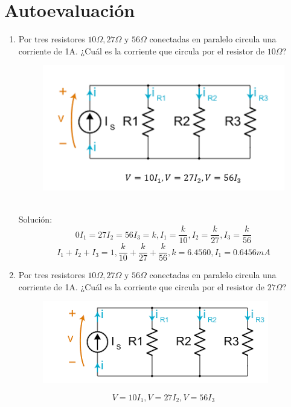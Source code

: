 \section{Autoevaluación}
\begin{enumerate}
	\item Por tres resistores $10\Omega, 27\Omega$ y $56\Omega$ conectadas en paralelo circula una corriente de 1A. ¿Cuál es la corriente que circula por el resistor de $10\Omega$?
	\begin{figure}[h]
		\centering
		\includegraphics[scale=1]{imagenes/1}
	\end{figure}
	\\ Solución: 
	\begin{equation*}
		0I_{1}=27I_{2}=56I_{3}=k, I_{1}=\frac{k}{10}, I_{2}=\frac{k}{27}, I_{3}=\frac{k}{56}
	\end{equation*}
	\begin{equation*}
		I_{1}+ I_{2}+I_{3}=1,  \frac{k}{10}+\frac{k}{27}+\frac{k}{56}, k=6.4560, I_{1}= 0.6456mA
	\end{equation*}
	\item Por tres resistores $10\Omega, 27\Omega$ y $56\Omega$ conectadas en paralelo circula una corriente de 1A. ¿Cuál es la corriente que circula por el resistor de $27\Omega$?
	\begin{figure}[h]
		\centering
		\includegraphics[scale=1]{imagenes/2}
	\end{figure}
	\begin{equation*}
		V=10I_{1}, V=27I_2{}, V=56I_{3}
	\end{equation*}

\end{enumerate}
